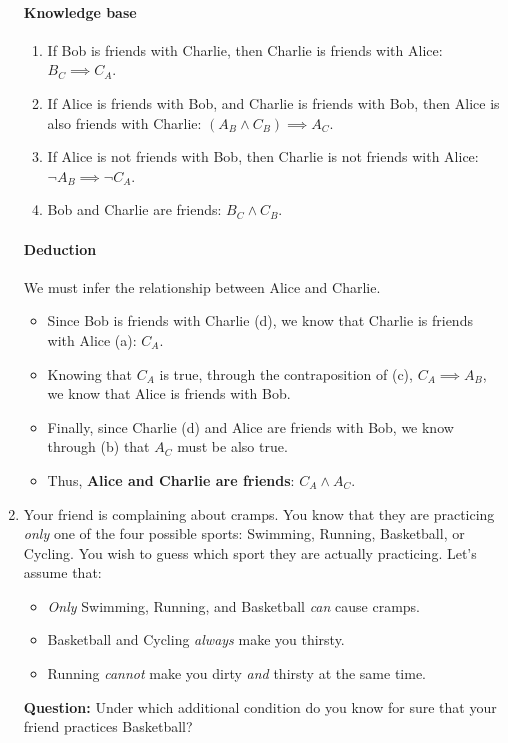 \documentclass[11pt]{article}
\numberwithin{equation}{section}
\newcommand{\sol}[1]{
    }
\begin{document}
\begin{enumerate}
{        \paragraph{Knowledge base}
        \begin{enumerate}
            \item If Bob is friends with Charlie, then Charlie is friends with Alice: $B_C \implies C_A$.
            \item If Alice is friends with Bob, and Charlie is friends with Bob, then Alice is also friends with Charlie: $(A_B \land C_B) \implies A_C$.
            \item If Alice is not friends with Bob, then Charlie is not friends with Alice: $\neg A_B \implies \neg C_A$.
            \item Bob and Charlie are friends: $B_C \land C_B$.
        \end{enumerate}

        \paragraph{Deduction}
        We must infer the relationship between Alice and Charlie.
        \begin{itemize}
            \item Since Bob is friends with Charlie (d), we know that Charlie is friends with Alice (a): $C_A$.
            \item Knowing that $C_A$ is true, through the contraposition of (c), $C_A \implies A_B$, we know that Alice is friends with Bob.
            \item Finally, since Charlie (d) and Alice are friends with Bob, we know through (b) that $A_C$ must be also true.
            \item Thus, \textbf{Alice and Charlie are friends}: $C_A \land A_C$.
        \end{itemize}
    }

    \item Your friend is complaining about cramps. You know that they are practicing \emph{only} one of the four possible sports: Swimming, Running, Basketball, or Cycling.
    You wish to guess which sport they are actually practicing. Let's assume that:
    \begin{itemize}
        \item \emph{Only} Swimming, Running, and Basketball \emph{can} cause cramps.
        \item Basketball and Cycling \emph{always} make you thirsty.
        \item Running \emph{cannot} make you dirty \emph{and} thirsty at the same time.
    \end{itemize}
    \textbf{Question:} Under which additional condition do you know for sure that your friend practices Basketball?
    \sol{

}
\end{enumerate}
\end{document}
